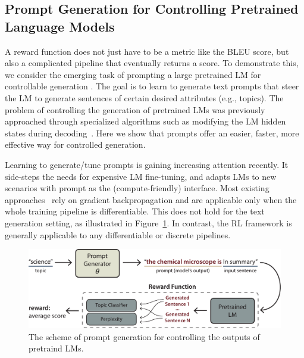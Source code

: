 \subsection{Prompt Generation for Controlling Pretrained Language Models}
\label{subsec:prompt-generation}





A reward function does not just have to be a metric like the BLEU score, but also a complicated pipeline that eventually returns a score.
To demonstrate this, we consider the emerging task of prompting a large pretrained LM for controllable generation \citep{Hu2017TowardCG,radford2019language,NEURIPS2020_1457c0d6}.
The goal is to learn to generate text prompts that steer the LM to generate sentences of certain desired attributes (e.g., topics). 
The problem of controlling the generation of pretrained LMs was previously approached through specialized algorithms such as modifying the LM hidden states during decoding~\citep{Dathathri2020Plug,krause2020gedi,qin2020backpropagation}. Here we show that prompts offer an easier, faster, more effective way for controlled generation.

Learning to generate/tune prompts is gaining increasing attention recently.
It side-steps the needs for expensive LM fine-tuning, and adapts LMs to new scenarios with prompt as the (compute-friendly) interface.
Most existing approaches~\citep{wallace2019universal,li2021prefix,lester2021power} rely on gradient backpropagation and are applicable only when the whole training pipeline is differentiable.
This does not hold for the text generation setting, as illustrated in Figure~\ref{fig:prompt-generation-flow}. In contrast, the RL framework is generally applicable to any differentiable or discrete pipelines.


\begin{figure}
\centering
\includegraphics[width=0.99\linewidth]{figures/prompt-generation-task-new.pdf}
\vspace{-12pt}
\caption{
The scheme of prompt generation for controlling the outputs of pretraind LMs.
}
\vspace{-7pt}
\label{fig:prompt-generation-flow}
\end{figure}


